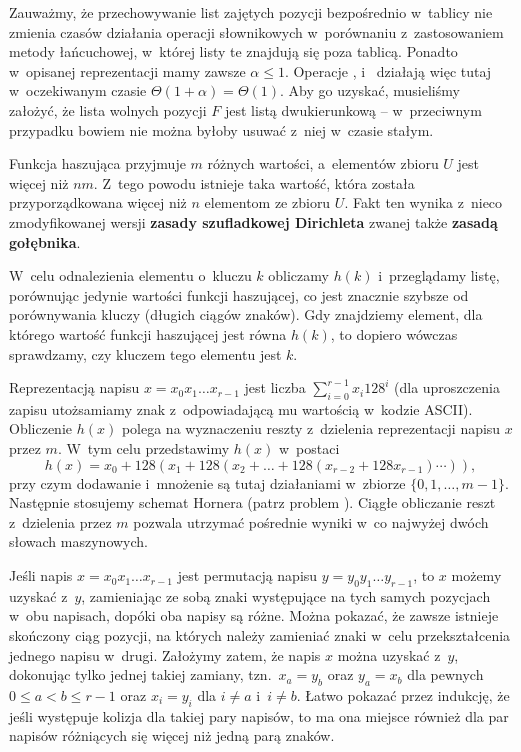Zauważmy, że przechowywanie list zajętych pozycji bezpośrednio w~tablicy nie zmienia czasów działania operacji słownikowych w~porównaniu z~zastosowaniem metody łańcuchowej, w~której listy te znajdują się poza tablicą.
Ponadto w~opisanej reprezentacji mamy zawsze $\alpha\le1$.
Operacje ,  i~ działają więc tutaj w~oczekiwanym czasie $\Theta(1+\alpha)=\Theta(1)$.
Aby go uzyskać, musieliśmy założyć, że lista wolnych pozycji $F$ jest listą dwukierunkową -- w~przeciwnym przypadku bowiem nie można byłoby usuwać z~niej w~czasie stałym.

\exercise %
Funkcja haszująca przyjmuje $m$ różnych wartości, a~elementów zbioru $U$ jest więcej niż $nm$.
Z~tego powodu istnieje taka wartość, która została przyporządkowana więcej niż $n$ elementom ze zbioru $U$.
Fakt ten wynika z~nieco zmodyfikowanej wersji \textbf{zasady szufladkowej Dirichleta} \cite{pigeonholeprinciple} zwanej także \textbf{zasadą gołębnika}.


\exercise %
W~celu odnalezienia elementu o~kluczu $k$ obliczamy $h(k)$ i~przeglądamy listę, porównując jedynie wartości funkcji haszującej, co jest znacznie szybsze od porównywania kluczy (długich ciągów znaków).
Gdy znajdziemy element, dla którego wartość funkcji haszującej jest równa $h(k)$, to dopiero wówczas sprawdzamy, czy kluczem tego elementu jest $k$.

\exercise %
Reprezentacją napisu $x=x_0x_1\dots x_{r-1}$ jest liczba $\sum_{i=0}^{r-1}x_i128^i$ (dla uproszczenia zapisu utożsamiamy znak z~odpowiadającą mu wartością w~kodzie ASCII).
Obliczenie $h(x)$ polega na wyznaczeniu reszty z~dzielenia reprezentacji napisu $x$ przez $m$.
W~tym celu przedstawimy $h(x)$ w~postaci
\[
	h(x) = x_0+128(x_1+128(x_2+\dots+128(x_{r-2}+128x_{r-1})\cdots)),
\]
przy czym dodawanie i~mnożenie są tutaj działaniami w~zbiorze $\{0,1,\dots,m-1\}$.
Następnie stosujemy schemat Hornera (patrz problem ).
Ciągłe obliczanie reszt z~dzielenia przez $m$ pozwala utrzymać pośrednie wyniki w~co najwyżej dwóch słowach maszynowych.

\exercise %
Jeśli napis $x=x_0x_1\dots x_{r-1}$ jest permutacją napisu $y=y_0y_1\dots y_{r-1}$, to $x$ możemy uzyskać z~$y$, zamieniając ze sobą znaki występujące na tych samych pozycjach w~obu napisach, dopóki oba napisy są różne.
Można pokazać, że zawsze istnieje skończony ciąg pozycji, na których należy zamieniać znaki w~celu przekształcenia jednego napisu w~drugi.
Założymy zatem, że napis $x$ można uzyskać z~$y$, dokonując tylko jednej takiej zamiany, tzn.\ $x_a=y_b$ oraz $y_a=x_b$ dla pewnych $0\le a<b\le r-1$ oraz $x_i=y_i$ dla $i\ne a$ i~$i\ne b$.
Łatwo pokazać przez indukcję, że jeśli występuje kolizja dla takiej pary napisów, to ma ona miejsce również dla par napisów różniących się więcej niż jedną parą znaków.


